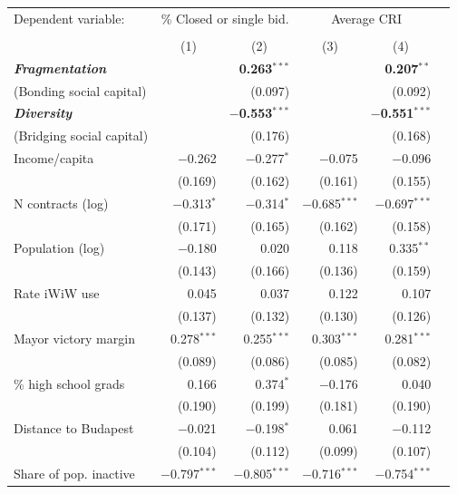 \begin{table}
\setlength\tabcolsep{2.5pt}
\begin{tabular}{l r r r r r }
\toprule
Dependent variable: & \multicolumn{2}{c}{\% Closed or single bid.} & \multicolumn{2}{c}{Average CRI} \\
\\[-1.8ex] & \multicolumn{1}{c}{(1)} & \multicolumn{1}{c}{(2)} &\multicolumn{1}{c}{(3)} & \multicolumn{1}{c}{(4)} \\ 
\cmidrule{2-3} \cmidrule{4-5}
 \textbf{\textit{Fragmentation}}  &  & \textbf{0.263$^{***}$} &  & \textbf{0.207$^{**}$} \\ 
  (Bonding social capital) &  & (0.097) &  & (0.092) \\ [.3cm]
 \textbf{\textit{Diversity}} &   & \textbf{$-$0.553$^{***}$} &  & \textbf{$-$0.551$^{***}$} \\ 
 (Bridging social capital) &    & (0.176) &  & (0.168) \\ [.3cm]
 Income/capita  & $-$0.262 & $-$0.277$^{*}$ & $-$0.075& $-$0.096 \\ 
  &  (0.169) & (0.162) & (0.161) & (0.155) \\ [.3cm]
 N contracts (log)  & $-$0.313$^{*}$ & $-$0.314$^{*}$ & $-$0.685$^{***}$ & $-$0.697$^{***}$ \\ 
  &  (0.171) & (0.165) & (0.162) & (0.158) \\ [.3cm]
 Population (log) & $-$0.180 & 0.020 & 0.118 & 0.335$^{**}$ \\ 
   & (0.143) & (0.166) & (0.136) & (0.159) \\ [.3cm]
 Rate iWiW use  & 0.045 & 0.037 & 0.122 & 0.107 \\ 
   & (0.137) & (0.132) & (0.130) & (0.126) \\ [.3cm]
 Mayor victory margin & 0.278$^{***}$ & 0.255$^{***}$ & 0.303$^{***}$ & 0.281$^{***}$ \\ 
  & (0.089) & (0.086) & (0.085) & (0.082) \\[.3cm]
 \% high school grads & 0.166 & 0.374$^{*}$ & $-$0.176 & 0.040 \\ 
  & (0.190) & (0.199) & (0.181) & (0.190) \\ [.3cm]
 Distance to Budapest  & $-$0.021 & $-$0.198$^{*}$ & 0.061 & $-$0.112 \\ 
   & (0.104) & (0.112) & (0.099) & (0.107) \\[.3cm]
 Share of pop. inactive &  $-$0.797$^{***}$ & $-$0.805$^{***}$ & $-$0.716$^{***}$ & $-$0.754$^{***}$ \\

\end{tabular}
\end{table}
